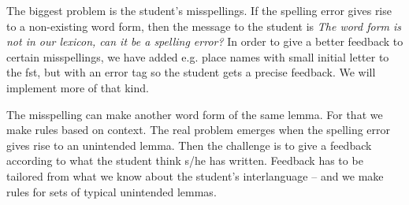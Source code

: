 \documentclass[11pt]{article}
\begin{document}
%

The biggest problem is the student's misspellings. If the spelling error gives rise to a non-existing word form, then the message to the student is \textit{The word form is not in our lexicon, can it be a spelling error?} In order to give a better feedback to certain misspellings, we have added e.g. place names with small initial letter to the fst, but with an error tag so the student gets a precise feedback. We will implement more of that kind.

The misspelling can make another word form of the same lemma. For that we make rules based on context. The real problem emerges when the spelling error gives rise to an unintended lemma. Then the challenge is to give a feedback according to what the student think s/he has written. Feedback has to be tailored from what we know about the student’s interlanguage – and we make rules for sets of typical unintended lemmas.
\end{document}
